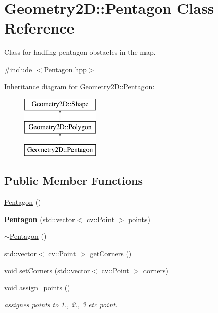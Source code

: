 \hypertarget{class_geometry2_d_1_1_pentagon}{}\section{Geometry2D\+:\+:Pentagon Class Reference}
\label{class_geometry2_d_1_1_pentagon}


Class for hadling pentagon obstacles in the map.  




{\ttfamily \#include $<$Pentagon.\+hpp$>$}

Inheritance diagram for Geometry2D\+:\+:Pentagon\+:\begin{figure}[H]
\begin{center}
\leavevmode
\includegraphics[height=3.000000cm]{class_geometry2_d_1_1_pentagon}
\end{center}
\end{figure}
\subsection*{Public Member Functions}
\begin{DoxyCompactItemize}
\item 
\mbox{\hyperlink{class_geometry2_d_1_1_pentagon_ab7db58850051b5fc59c5f16428020e6b}{Pentagon}} ()
\item 
\mbox{\label{class_geometry2_d_1_1_pentagon_a0c1a7da132f79d4959988dda7a9d3ab9}} 
{\bfseries Pentagon} (std\+::vector$<$ cv\+::\+Point $>$ \mbox{\hyperlink{class_geometry2_d_1_1_polygon_ab965e028324c2199022da00ff7eef14b}{points}})
\item 
\mbox{\hyperlink{class_geometry2_d_1_1_pentagon_ac7b31f244f4419cc5b564a6b35d0f1fc}{$\sim$\+Pentagon}} ()
\item 
std\+::vector$<$ cv\+::\+Point $>$ \mbox{\hyperlink{class_geometry2_d_1_1_pentagon_a132f80b78a2bf41e393becaaae5b535e}{get\+Corners}} ()
\item 
void \mbox{\hyperlink{class_geometry2_d_1_1_pentagon_ae65ba44439b3fccd94c35b74b877e05f}{set\+Corners}} (std\+::vector$<$ cv\+::\+Point $>$ corners)
\item 
\mbox{\label{class_geometry2_d_1_1_pentagon_a18a04ba60e0713eb90de37651adc9d4f}} 
void \mbox{\hyperlink{class_geometry2_d_1_1_pentagon_a18a04ba60e0713eb90de37651adc9d4f}{assign\+\_\+points}} ()
\begin{DoxyCompactList}\small\item\em assignes points to 1., 2., 3 etc point. \end{DoxyCompactList}\end{DoxyCompactItemize}
